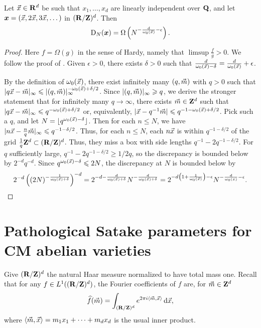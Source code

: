 \begin{theorem}
Let $\vec{x}\in \mathbf{R}^d$ be such that $x_1,\dots,x_d$ are linearly independent over 
$\mathbf{Q}$, and let ${\boldsymbol x}=(\vec{x},2\vec{x},3\vec{x},\dots)$ in $(\mathbf{R}/\mathbf{Z})^d$. Then 
\[
	\operatorname{D}_N({\boldsymbol x}) = \Omega\left(N^{-\frac{d}{\omega_0(\vec{x})}-\epsilon} \right).
\]
\end{theorem}
\begin{proof}
Here $f=\Omega(g)$ in the sense of Hardy, namely that $\limsup \frac f g>0$. We 
follow the proof of \cite[Ch.~2, Th.~3.3]{kuipers-niederreiter-1974}. Given 
$\epsilon>0$, there exists $\delta>0$ such that 
$\frac{d}{\omega_0(\vec{x})-\delta} = \frac{d}{\omega_0(\vec{x})} + \epsilon$. 

By the definition of $\omega_0(\vec{x})$, there exist infinitely many 
$(q,\vec{m})$ with $q>0$ such that 
$|q \vec{x} - \vec{m}|_\infty \leqslant |(q,\vec{m})|_\infty^{-\omega_0(\vec{x})+\delta/2}$. 
Since $|(q,\vec{m})|_\infty \geqslant q$, we derive the stronger 
statement that for infinitely many $q\to \infty$, there exists 
$\vec{m}\in \mathbf{Z}^d$ such that 
$|q \vec{x}-\vec{m}|_\infty \leqslant q^{-\omega_0(\vec{x})+\delta/2}$ or, equivalently, 
$|\vec{x}-q^{-1}\vec{m}| \leqslant q^{-1-\omega_0(\vec{x})+\delta/2}$. Pick such a $q$, and 
let $N=\lfloor q^{\omega_0(\vec{x})-\delta}\rfloor$. Then for each $n\leqslant N$, we 
have $|n \vec{x} - \frac n q \vec{m}|_\infty \leqslant q^{-1-\delta/2}$. Thus, for each 
$n\leqslant N$, each $n \vec{x}$ is within $q^{-1-\delta/2}$ of the grid 
$\frac 1 q \mathbf{Z}^d\subset (\mathbf{R}/\mathbf{Z})^d$. Thus, they miss a box with side lengths 
$q^{-1} - 2 q^{-1-\delta/2}$. For $q$ sufficiently large, 
$q^{-1} - 2 q^{-1-\delta/2} \geqslant 1/2q$, so the discrepancy is 
bounded below by $2^{-d} q^{-d}$. Since $q^{\omega_0(\vec{x})-\delta} \leqslant 2 N$, 
the discrepancy at $N$ is bounded below by 
\[
	2^{-d} \left( (2 N)^{-\frac{1}{\omega_0(\vec{x})+\delta}}\right)^{-d} 
		= 2^{-d-\frac{d}{\omega_0(\vec{x})+\delta}} N^{-\frac{d}{\omega_0(\vec{x})+\delta}}
		= 2^{-d\left(1+\frac{1}{\omega_0(\vec{x})}\right)-\epsilon} N^{-\frac{d}{\omega_0(x)}-\epsilon} .
\]
\end{proof}






\section{Pathological Satake parameters for CM abelian varieties}

Give $(\mathbf{R}/\mathbf{Z})^d$ the natural Haar measure normalized to have total mass one. 
Recall that for any $f\in L^1((\mathbf{R}/\mathbf{Z})^d)$, the Fourier coefficients of $f$ 
are, for $\vec{m}\in \mathbf{Z}^d$ 
\[
	\widehat f(\vec{m}) = \int_{(\mathbf{R}/\mathbf{Z})^d} e^{2\pi i \langle \vec{m},\vec{x}\rangle} \, \mathrm{d} \vec{x} ,
\]
where $\langle \vec{m},\vec{x}\rangle = m_1 x_1 + \cdots + m_d x_d$ is the usual inner 
product. 

